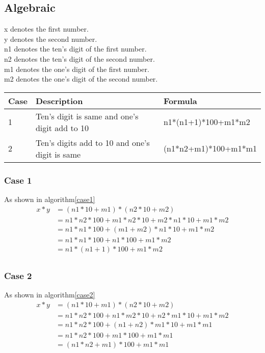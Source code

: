 \documentclass{article}
\begin{document}
\subsection{Algebraic}
x denotes the first number.\\
y denotes the second number.\\
n1 denotes the ten's digit of the first number.\\
n2 denotes the ten's digit of the second number.\\
m1 denotes the one's digit of the first number.\\
m2 denotes the one's digit of the second number.\\
\begin{table}[h!]
\begin{tabular}{l|l|l}
\hline
\textbf{Case} & \textbf{Description} & \textbf{Formula}\\
\hline
1 & Ten's digit is same and one's digit add to 10 & n1*(n1+1)*100+m1*m2\\
\hline
2 & Ten's digits add to 10 and one's digit is same & (n1*n2+m1)*100+m1*m1\\
\end{tabular}
\end{table}

\subsubsection{Case 1}
As shown in algorithm\ref{case1}
\begin{align*}
x*y&=(n1*10+m1)*(n2*10+m2)\\
&=n1*n2*100+m1*n2*10+m2*n1*10+m1*m2\\
&=n1*n1*100+(m1+m2)*n1*10+m1*m2\tag*{n1=n2}\\
&=n1*n1*100+n1*100+m1*m2\tag*{m1+m2=10}\\
&=n1*(n1+1)*100+m1*m2\\
\end{align*}


\subsubsection{Case 2}
As shown in algorithm\ref{case2}
\begin{align*}
x*y&=(n1*10+m1)*(n2*10+m2)\\
&=n1*n2*100+n1*m2*10+n2*m1*10+m1*m2\\
&=n1*n2*100+(n1+n2)*m1*10+m1*m1\tag*{m1=m2}\\
&=n1*n2*100+m1*100+m1*m1\tag*{n1+n2=10}\\
&=(n1*n2+m1)*100+m1*m1\\
\end{align*}
\end{document}
